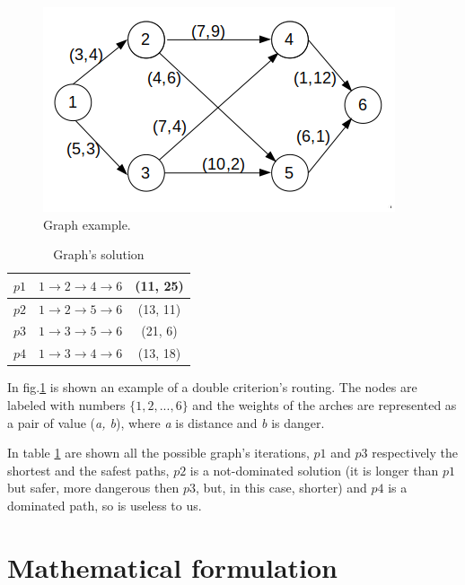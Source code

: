 \documentclass[a4paper,12pt]{report}
\begin{document}
\begin{figure}
	\centering
	\includegraphics[width=\linewidth]{img/exampleGraph1}
	\caption{Graph example.}
	\label{fig:graphExample}
\end{figure}

\begin{table}[]
	\centering
	\begin{tabular}{|c|c|c|}
		\hline
		$p1$ & $1\to2\to4\to6$ & (11, 25) \\ \hline
		$p2$ & $1\to2\to5\to6$ & (13, 11)  \\ \hline
		$p3$ & $1\to3\to5\to6$ & (21, 6)  \\ \hline
		$p4$ & $1\to3\to4\to6$ & (13, 18)  \\ \hline
	\end{tabular}
	\caption{Graph's solution}
	\label{tab:graphExample}
\end{table}

In fig.\ref{fig:graphExample} is shown an example of a double criterion's routing. The nodes are labeled with numbers $\{1,2, ..., 6\}$ and the weights of the arches are represented as a pair of value (\textit{a, b}), where \textit{a} is distance and \textit{b} is danger.

In table \ref{tab:graphExample} are shown all the possible graph's iterations, $p1$ and $p3$ respectively the shortest and the safest paths, $p2$ is a not-dominated solution (it is longer than $p1$ but safer, more dangerous then $p3$, but, in this case, shorter) and $p4$ is a dominated path, so is useless to us.


 
\section{Mathematical formulation}
\end{document}
